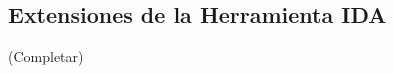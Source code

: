 \begin{appendices}
\chapter{}
\section{Extensiones de la Herramienta IDA}
(Completar)
\end{appendices}


